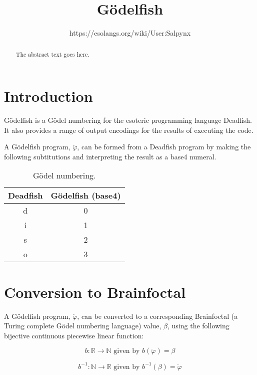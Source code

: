\documentclass{article}
\begin{document}
\title{Gödelfish}
\author{https://esolangs.org/wiki/User:Salpynx}

\maketitle

\begin{abstract}
The abstract text goes here.
\end{abstract}

\section{Introduction}
Gödelfish is a Gödel numbering for the esoteric programming language Deadfish. It also provides a range of output encodings for the results of executing the code.

A Gödelfish program, $\ddot{\varphi}$, can be formed from a Deadfish program by making the following subtitutions and interpreting the result as a base4 numeral.

\begin{table}[h!]
  \begin{center}
    \caption{Gödel numbering.}
    \label{tab:table1}
    \begin{tabular}{c|c} %
      \textbf{Deadfish} & \textbf{Gödelfish (base4)} \\
      \hline
      d & 0\\
      i & 1\\
      s & 2\\
      o & 3\\
    \end{tabular}
  \end{center}
\end{table}

\section{Conversion to Brainfoctal}

A Gödelfish program, $\ddot{\varphi}$, can be converted to a corresponding Brainfoctal (a Turing complete Gödel numbering language) value, $\beta$, using the following bijective continuous piecewise linear function:

\[
b:\mathbb{R} \to \mathbb{N} \text{ given by }
b(\ddot{\varphi}) = \beta
\]

\[
b^{-1}:\mathbb{N} \to \mathbb{R} \text{ given by }
b^{-1}(\beta) = \ddot{\varphi}
\]
\end{document}
